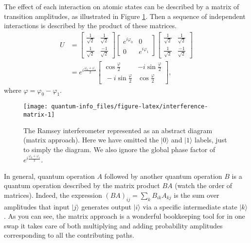 \documentclass{article}
\begin{document}
The effect of each interaction on atomic states can be described by a matrix of transition amplitudes, as illustrated in Figure \ref{fig:interference-matrix}.
Then a sequence of independent interactions is described by the product of these matrices.
\[
  \begin{aligned}
    U &=
    \begin{bmatrix}
      \frac{1}{\sqrt2} & \frac{1}{\sqrt2}
    \\\frac{1}{\sqrt2} & \frac{-1}{\sqrt2}
    \end{bmatrix}
    \begin{bmatrix}
      e^{i\varphi_0} & 0
    \\0 & e^{i\varphi_1}
    \end{bmatrix}
    \begin{bmatrix}
      \frac{1}{\sqrt2} & \frac{1}{\sqrt2}
    \\\frac{1}{\sqrt2} & \frac{-1}{\sqrt2}
    \end{bmatrix}
  \\&= e^{i\frac{\varphi_0+\varphi_1}{2}}
    \begin{bmatrix}
      \cos\frac{\varphi}{2} & -i\sin\frac{\varphi}{2}
    \\\ -i\sin\frac{\varphi}{2}& \cos\frac{\varphi}{2}
    \end{bmatrix},
  \end{aligned}
\]
where \(\varphi = \varphi_0-\varphi_1\).



\begin{figure}[H]

{\centering \texttt{[image: quantum-info\_files/figure-latex/interference-matrix-1]} 

}

\caption{The Ramsey interferometer represented as an abstract diagram (matrix approach). Here we have omitted the \(|0\rangle\) and \(|1\rangle\) labels, just to simply the diagram. We also ignore the global phase factor of \(e^{i\frac{\varphi_0+\varphi_1}{2}}\).}\label{fig:interference-matrix}
\end{figure}

In general, quantum operation \(A\) followed by another quantum operation \(B\) is a quantum operation described by the matrix product \(BA\) (watch the order of matrices).
Indeed, the expression \((BA)_{ij}=\sum_k B_{ik}A_{kj}\) is the sum over amplitudes that input \(|j\rangle\) generates output \(|i\rangle\) via a specific intermediate state \(|k\rangle\).
As you can see, the matrix approach is a wonderful bookkeeping tool for in one swap it takes care of both multiplying and adding probability amplitudes corresponding to all the contributing paths.
\end{document}
